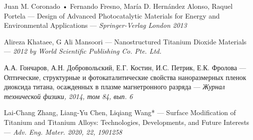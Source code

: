 \documentclass[oneside,final,12pt]{extreport}
\begin{document}
\newpage
\begin{thebibliography}{}

      Juan M. Coronado • Fernando Fresno, María D. Hernández Alonso,
Raquel Portela --- Design of Advanced Photocatalytic Materials for Energy and Environmental Applications --- \it{Springer-Verlag London 2013} \normalfont

      Alireza Khataee, G Ali Mansoori  ---  Nanostructured Titanium Dioxide Materials --- \it{2012 by World Scientific Publishing Co. Pte. Ltd.
} \normalfont
    
      А.А. Гончаров, А.Н. Добровольский, Е.Г. Костин, И.С. Петрик, Е.К. Фролова  ---  Оптические, структурные и фотокаталитические свойства наноразмерных пленок диоксида титана, осажденных в плазме магнетронного разряда --- \it {Журнал технической физики, 2014, том 84, вып. 6} \normalfont
    
     Lai-Chang Zhang, Liang-Yu Chen, Liqiang Wang*  ---  Surface Modification of Titanium and Titanium Alloys: Technologies, Developments, and Future Interests --- \it {Adv. Eng. Mater. 2020, 22, 1901258} \normalfont
    
\end{thebibliography}
\end{document}
